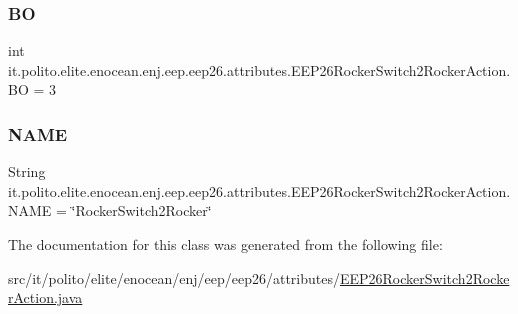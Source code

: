 \hypertarget{classit_1_1polito_1_1elite_1_1enocean_1_1enj_1_1eep_1_1eep26_1_1attributes_1_1_e_e_p26_rocker_switch2_rocker_action_a822242bab6d2aa944baaa82818e215c7}{}\label{classit_1_1polito_1_1elite_1_1enocean_1_1enj_1_1eep_1_1eep26_1_1attributes_1_1_e_e_p26_rocker_switch2_rocker_action_a822242bab6d2aa944baaa82818e215c7} 
\subsubsection{\texorpdfstring{BO}{BO}}
{\footnotesize\ttfamily int it.\+polito.\+elite.\+enocean.\+enj.\+eep.\+eep26.\+attributes.\+E\+E\+P26\+Rocker\+Switch2\+Rocker\+Action.\+BO = 3\hspace{0.3cm}{\ttfamily [static]}}

\hypertarget{classit_1_1polito_1_1elite_1_1enocean_1_1enj_1_1eep_1_1eep26_1_1attributes_1_1_e_e_p26_rocker_switch2_rocker_action_ad4c7f1830e4658e952b66bc5d3a4fd09}{}\label{classit_1_1polito_1_1elite_1_1enocean_1_1enj_1_1eep_1_1eep26_1_1attributes_1_1_e_e_p26_rocker_switch2_rocker_action_ad4c7f1830e4658e952b66bc5d3a4fd09} 
\subsubsection{\texorpdfstring{N\+A\+ME}{NAME}}
{\footnotesize\ttfamily String it.\+polito.\+elite.\+enocean.\+enj.\+eep.\+eep26.\+attributes.\+E\+E\+P26\+Rocker\+Switch2\+Rocker\+Action.\+N\+A\+ME = \char`\"{}Rocker\+Switch2\+Rocker\char`\"{}\hspace{0.3cm}{\ttfamily [static]}}



The documentation for this class was generated from the following file\+:\begin{DoxyCompactItemize}
\item 
src/it/polito/elite/enocean/enj/eep/eep26/attributes/\hyperlink{_e_e_p26_rocker_switch2_rocker_action_8java}{E\+E\+P26\+Rocker\+Switch2\+Rocker\+Action.\+java}\end{DoxyCompactItemize}
